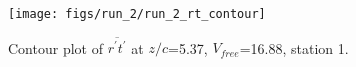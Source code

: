 \begin{figure}[H]
\centering
\texttt{[image: figs/run\_2/run\_2\_rt\_contour]}
\caption{Contour plot of $\overline{r^\prime t^\prime}$ at $z/c$=5.37, $V_{free}$=16.88, station 1.}
\label{fig:run_2_rt_contour}
\end{figure}


